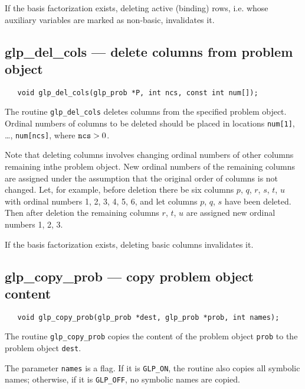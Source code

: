 If the basis factorization exists, deleting active (binding) rows,
i.e. whose auxiliary variables are marked as non-basic, invalidates it.


\subsection{glp\_del\_cols --- delete columns from problem object}

\synopsis

\begin{verbatim}
   void glp_del_cols(glp_prob *P, int ncs, const int num[]);
\end{verbatim}

\description

The routine \verb|glp_del_cols| deletes columns from the specified
problem object. Ordinal numbers of columns to be deleted should be
placed in locations \verb|num[1]|, \dots, \verb|num[ncs]|, where
${\tt ncs}>0$.

Note that deleting columns involves changing ordinal numbers of other
columns remaining in\linebreak the problem object. New ordinal numbers
of the remaining columns are assigned under the assumption that the
original order of columns is not changed. Let, for example, before
deletion  there be six columns $p$, $q$, $r$, $s$, $t$, $u$ with
ordinal numbers 1, 2, 3, 4, 5, 6, and let columns $p$, $q$, $s$ have
been deleted. Then after deletion the remaining columns $r$, $t$, $u$
are assigned new ordinal numbers 1, 2, 3.

If the basis factorization exists, deleting basic columns invalidates
it.

\subsection{glp\_copy\_prob --- copy problem object content}

\synopsis

\begin{verbatim}
   void glp_copy_prob(glp_prob *dest, glp_prob *prob, int names);
\end{verbatim}

\description

The routine \verb|glp_copy_prob| copies the content of the problem
object \verb|prob| to the problem object \verb|dest|.

The parameter \verb|names| is a flag. If it is \verb|GLP_ON|,
the routine also copies all symbolic names; otherwise, if it is
\verb|GLP_OFF|, no symbolic names are copied.

